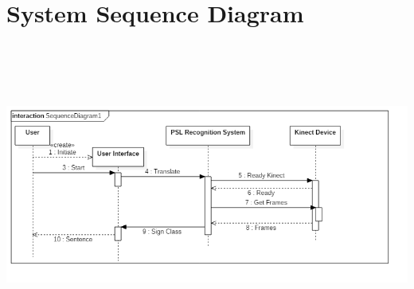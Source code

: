 \clearpage
\section{System Sequence Diagram}

\includegraphics[height=10cm, width=17cm]{ThesisFigs/sequencediagram}

